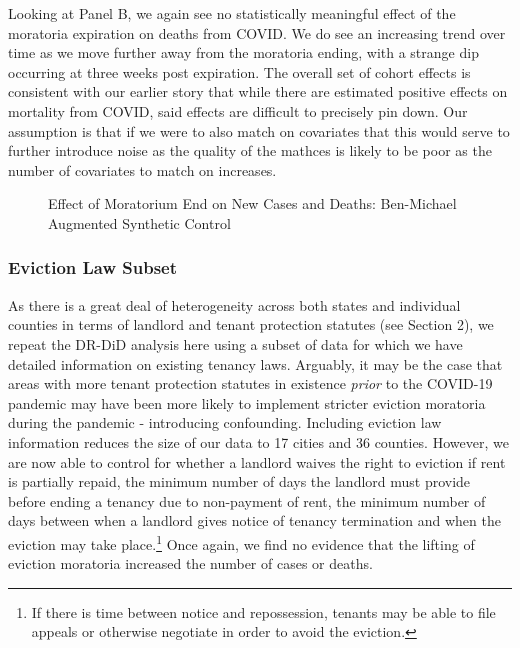 \documentclass[12pt]{amsart}
\begin{document}
Looking at Panel B, we again see no statistically meaningful effect of the moratoria expiration on deaths from COVID. We do see an increasing trend over time as we move further away from the moratoria ending, with a strange dip occurring at three weeks post expiration. The overall set of cohort effects is consistent with our earlier story that while there are estimated positive effects on mortality from COVID, said effects are difficult to precisely pin down. Our assumption is that if we were to also match on covariates that this would serve to further introduce noise as the quality of the mathces is likely to be poor as the number of covariates to match on increases. 

\begin{figure}[H]
    \caption{Effect of Moratorium End on New Cases and Deaths: Ben-Michael Augmented Synthetic Control \label{fig:ASC1}}
    \centering %
{\footnotesize \justifying {} \par}
\end{figure}

\subsubsection{Eviction Law Subset}

As there is a great deal of heterogeneity across both states and individual counties in terms of landlord and tenant protection statutes (see Section 2), we repeat the DR-DiD analysis here using a subset of data for which we have detailed information on existing tenancy laws. Arguably, it may be the case that areas with more tenant protection statutes in existence \textit{prior} to the COVID-19 pandemic may have been more likely to implement stricter eviction moratoria during the pandemic - introducing confounding. Including eviction law information reduces the size of our data to 17 cities and 36 counties. However, we are now able to control for whether a landlord waives the right to eviction if rent is partially repaid, the minimum number of days the landlord must provide before ending a tenancy due to non-payment of rent, the minimum number of days between when a landlord gives notice of tenancy termination and when the eviction may take place.\footnote{If there is time between notice and repossession, tenants may be able to file appeals or otherwise negotiate in order to avoid the eviction.} Once again, we find no evidence that the lifting of eviction moratoria increased the number of cases or deaths. 
\end{document}
